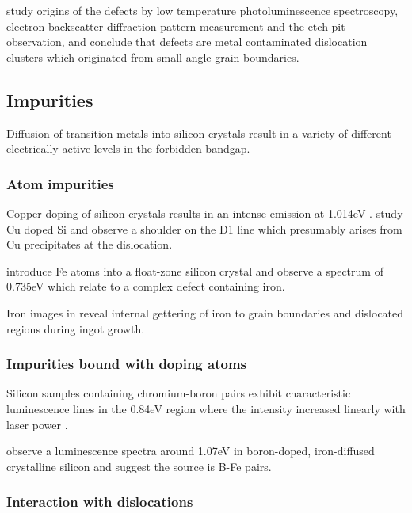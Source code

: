\cite{sugimoto07} study origins of the defects by low temperature photoluminescence spectroscopy, electron backscatter diffraction pattern measurement and the etch-pit observation, and conclude that defects are metal contaminated dislocation clusters which originated from small angle grain boundaries.





\subsection{Impurities}

Diffusion of transition metals into silicon crystals result in a variety of different electrically active levels in the forbidden bandgap.

\subsubsection{Atom impurities}

Copper doping of silicon crystals results in an intense emission at 1.014eV \cite{weber82}. \cite{weronek91} study Cu doped Si and observe a shoulder on the D1 line which presumably arises from Cu precipitates at the dislocation.

\cite{calao88} introduce Fe atoms into a float-zone silicon crystal and observe a spectrum of 0.735eV which relate to a complex defect containing iron.



Iron images in \cite{macdonald08} reveal internal gettering of iron to grain boundaries and dislocated regions during ingot growth.



\subsubsection{Impurities bound with doping atoms}

Silicon samples containing chromium-boron pairs exhibit characteristic luminescence lines in the 0.84eV region where the intensity increased linearly with laser power \cite{conzelmann83}. 

\cite{mohring83} observe a luminescence spectra around 1.07eV in boron-doped, iron-diffused crystalline silicon and suggest the source is B-Fe pairs.

\subsubsection{Interaction with dislocations}

